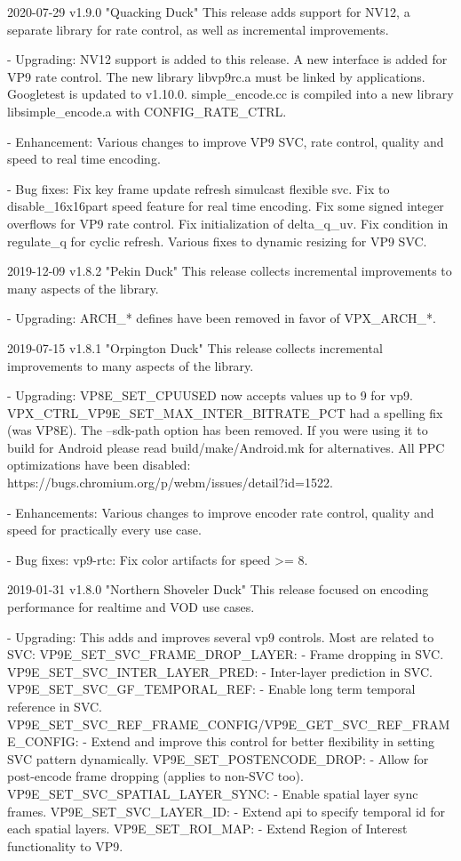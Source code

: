 \begin{DoxyVerbInclude}
2020-07-29 v1.9.0 "Quacking Duck"
  This release adds support for NV12, a separate library for rate control, as
  well as incremental improvements.

  - Upgrading:
    NV12 support is added to this release.
    A new interface is added for VP9 rate control. The new library libvp9rc.a
    must be linked by applications.
    Googletest is updated to v1.10.0.
    simple_encode.cc is compiled into a new library libsimple_encode.a with
    CONFIG_RATE_CTRL.

  - Enhancement:
    Various changes to improve VP9 SVC, rate control, quality and speed to real
    time encoding.

  - Bug fixes:
    Fix key frame update refresh simulcast flexible svc.
    Fix to disable_16x16part speed feature for real time encoding.
    Fix some signed integer overflows for VP9 rate control.
    Fix initialization of delta_q_uv.
    Fix condition in regulate_q for cyclic refresh.
    Various fixes to dynamic resizing for VP9 SVC.

2019-12-09 v1.8.2 "Pekin Duck"
  This release collects incremental improvements to many aspects of the library.

  - Upgrading:
    ARCH_* defines have been removed in favor of VPX_ARCH_*.

2019-07-15 v1.8.1 "Orpington Duck"
  This release collects incremental improvements to many aspects of the library.

  - Upgrading:
    VP8E_SET_CPUUSED now accepts values up to 9 for vp9.
    VPX_CTRL_VP9E_SET_MAX_INTER_BITRATE_PCT had a spelling fix (was VP8E).
    The --sdk-path option has been removed. If you were using it to build for
      Android please read build/make/Android.mk for alternatives.
    All PPC optimizations have been disabled:
      https://bugs.chromium.org/p/webm/issues/detail?id=1522.

  - Enhancements:
    Various changes to improve encoder rate control, quality and speed
      for practically every use case.

  - Bug fixes:
    vp9-rtc: Fix color artifacts for speed >= 8.

2019-01-31 v1.8.0 "Northern Shoveler Duck"
  This release focused on encoding performance for realtime and VOD use cases.

  - Upgrading:
    This adds and improves several vp9 controls. Most are related to SVC:
      VP9E_SET_SVC_FRAME_DROP_LAYER:
        - Frame dropping in SVC.
      VP9E_SET_SVC_INTER_LAYER_PRED:
        - Inter-layer prediction in SVC.
      VP9E_SET_SVC_GF_TEMPORAL_REF:
        - Enable long term temporal reference in SVC.
      VP9E_SET_SVC_REF_FRAME_CONFIG/VP9E_GET_SVC_REF_FRAME_CONFIG:
        - Extend and improve this control for better flexibility in setting SVC
          pattern dynamically.
      VP9E_SET_POSTENCODE_DROP:
        - Allow for post-encode frame dropping (applies to non-SVC too).
      VP9E_SET_SVC_SPATIAL_LAYER_SYNC:
        - Enable spatial layer sync frames.
      VP9E_SET_SVC_LAYER_ID:
        - Extend api to specify temporal id for each spatial layers.
      VP9E_SET_ROI_MAP:
        - Extend Region of Interest functionality to VP9.


\end{DoxyVerbInclude}
